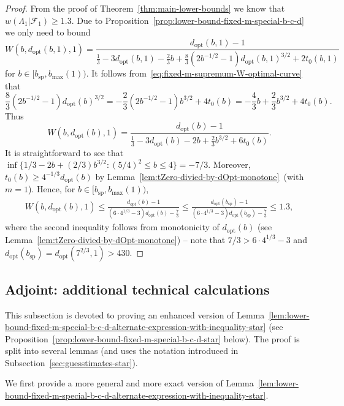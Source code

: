 \documentclass[a4paper]{amsart} %
\theoremstyle{definition}
\theoremstyle{remark}
\numberwithin{equation}{section}
\newcommand*{\weakconstrestricted}[2]{w(#1|#2)} %
\newcommand*{\fclassspec}[1]{\mathcal{F}_{#1}}
\newcommand*{\XXXspecialbd}{W}
\newcommand*{\bMax}{b_{\max}}
\newcommand*{\dOpt}{d_{\mathrm{opt}}}
\newcommand*{\bSh}{b_{\operatorname{sp}}}
\begin{document}
\begin{proof}
	From the proof of Theorem~\ref{thm:main-lower-bounds} we know that 	$\weakconstrestricted{\Lambda_1}{\fclassspec{1}} \geq 1.3$.
	Due to Proposition~\ref{prop:lower-bound-fixed-m-special-b-c-d} we only
	need to bound
	\[
	\XXXspecialbd(b,\dOpt(b,1),1)
	= \frac{\dOpt(b,1)-1}{ \frac{1}{3} - 3 \dOpt(b,1) - \frac{2}{3}b +
		\frac{8}{3}(2b^{-1/2}  -1) \dOpt(b,1)^{3/2} 
		+2t_0(b,1)}	
	\]
	for $b\in [\bSh, \bMax(1))$. 
	It follows from~\eqref{eq:fixed-m-supremum-W-optimal-curve} that
	\[
	\frac{8}{3}(2b^{-1/2}  -1) \dOpt(b)^{3/2} = -\frac{2}{3}(2b^{-1/2}  -1) b^{3/2} + 4t_0(b) 
	=
	-\frac{4}{3}b  +\frac{2}{3} b^{3/2} + 4t_0(b). 
	\]
	Thus
	\[
	\XXXspecialbd(b,\dOpt(b),1)
	= \frac{\dOpt(b)-1}{ \frac{1}{3} - 3 \dOpt(b) - 2b +
		\frac{2}{3}b^{3/2} + 6 t_0(b)}.	
	\]
	It is straightforward to see that 
	$\inf\{ 1/3 - 2b +(2/3) b^{3/2} : (5/4)^2 \leq b \leq 4\} = -7/3$.
	Moreover,  $t_0(b) \geq 4^{-1/3} \dOpt(b)$ by Lemma~\ref{lem:tZero-divied-by-dOpt-monotone}\
	(with $m=1$).
	Hence, for $b\in [\bSh, \bMax(1))$,
	\begin{align*}
	\XXXspecialbd(b,\dOpt(b),1)
	\leq \frac{\dOpt(b)-1}{ (6\cdot 4^{1/3}- 3 )\dOpt(b) - \frac{7}{3}}
	\leq
	\frac{\dOpt(\bSh)-1}{ (6\cdot 4^{1/3}- 3 )\dOpt(\bSh) - \frac{7}{3}}
	\leq 1.3,	
	\end{align*}
	where the second inequality  follows from monotonicity of $\dOpt(b)$ (see Lemma~\ref{lem:tZero-divied-by-dOpt-monotone})
	-- note that $7/3 > 6\cdot 4^{1/3}- 3$ and $\dOpt(\bSh) = \dOpt(7^{2/3},1) > 430$.
\end{proof}	



\subsection{Adjoint: additional technical calculations}

This subsection is devoted to proving an enhanced version of Lemma~\ref{lem:lower-bound-fixed-m-special-b-c-d-alternate-expression-with-inequality-star}
(see Proposition~\ref{prop:lower-bound-fixed-m-special-b-c-d-star} below).
The proof is split into several lemmas (and uses the notation introduced in Subsection~\ref{sec:guesstimates-star}).

We first provide a more general and more exact version of Lemma~\ref{lem:lower-bound-fixed-m-special-b-c-d-alternate-expression-with-inequality-star}. %
\end{document}
